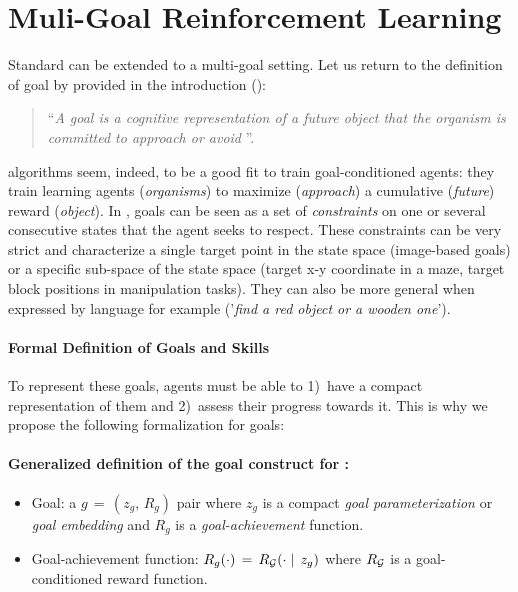 \section{Muli-Goal Reinforcement Learning}
\label{sec:background_mg_rl}
Standard \rl can be extended to a multi-goal setting. Let us return to the definition of goal by \citet{elliot2008goal} provided in the introduction ():
\begin{quote}
   	``\textit{A goal is a cognitive representation of a future object that the organism is committed to approach or
    avoid} ''.
\end{quote}
\rl algorithms seem, indeed, to be a good fit to train goal-conditioned agents: they train learning agents (\textit{organisms}) to maximize (\textit{approach}) a cumulative (\textit{future}) reward (\textit{object}). In \rl, goals can be seen as a set of \textit{constraints} on one or several consecutive states that the agent seeks to respect. These constraints can be very strict and characterize a single target point in the state space (\eg image-based goals) or a specific sub-space of the state space (\eg target x-y coordinate in a maze, target block positions in manipulation tasks). They can also be more general when expressed by language for example (\eg '\textit{find a red object or a wooden one}'). 

\paragraph{Formal Definition of Goals and Skills}

To represent these goals, \rl agents must be able to 1)~have a compact representation of them and 2)~assess their progress towards it. This is why we propose the following formalization for \rl goals: 

\begin{tcolorbox}
\small
\paragraph{Generalized definition of the goal construct for \rl:}
\begin{itemize}
    \item \gls{Goal}: a $g\,=\,(z_g,\,R_g)$ pair where $z_g$ is a compact \textit{goal parameterization} or \textit{goal embedding} and $R_g$ is a \textit{goal-achievement} function.
    \item \gls{Goal-achievement function}: $R_g(\cdot)\,=\,R_{\mathcal{G}}(\cdot\mid\,z_g)$ where $R_{\mathcal{G}}$ is a goal-conditioned reward function.
\end{itemize}
\end{tcolorbox}

